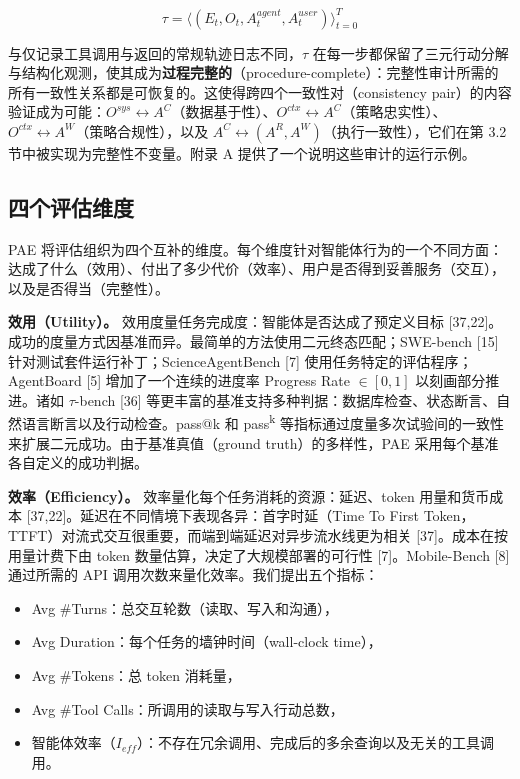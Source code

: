 \documentclass[11pt,UTF8,fontset=fandol]{ctexart}
\begin{document}
\begin{equation}
\tau = \langle (E_t, O_t, A_t^{agent}, A_t^{user}) \rangle_{t=0}^{T} \tag{2}
\end{equation}

与仅记录工具调用与返回的常规轨迹日志不同，$\tau$ 在每一步都保留了三元行动分解与结构化观测，使其成为\textbf{过程完整的}（procedure-complete）：完整性审计所需的所有一致性关系都是可恢复的。这使得跨四个一致性对（consistency pair）的内容验证成为可能：$O^{sys} \leftrightarrow A^C$（数据基于性）、$O^{ctx} \leftrightarrow A^C$（策略忠实性）、$O^{ctx} \leftrightarrow A^W$（策略合规性），以及 $A^C \leftrightarrow (A^R, A^W)$（执行一致性），它们在第 3.2 节中被实现为完整性不变量。附录 A 提供了一个说明这些审计的运行示例。

\subsection{四个评估维度}

PAE 将评估组织为四个互补的维度。每个维度针对智能体行为的一个不同方面：达成了什么（效用）、付出了多少代价（效率）、用户是否得到妥善服务（交互），以及是否得当（完整性）。

\textbf{效用（Utility）。} 效用度量任务完成度：智能体是否达成了预定义目标 [37,22]。成功的度量方式因基准而异。最简单的方法使用二元终态匹配；SWE-bench [15] 针对测试套件运行补丁；ScienceAgentBench [7] 使用任务特定的评估程序；AgentBoard [5] 增加了一个连续的进度率 Progress Rate $\in [0, 1]$ 以刻画部分推进。诸如 $\tau$-bench [36] 等更丰富的基准支持多种判据：数据库检查、状态断言、自然语言断言以及行动检查。pass@k 和 pass\textsuperscript{k} 等指标通过度量多次试验间的一致性来扩展二元成功。由于基准真值（ground truth）的多样性，PAE 采用每个基准各自定义的成功判据。

\textbf{效率（Efficiency）。} 效率量化每个任务消耗的资源：延迟、token 用量和货币成本 [37,22]。延迟在不同情境下表现各异：首字时延（Time To First Token，TTFT）对流式交互很重要，而端到端延迟对异步流水线更为相关 [37]。成本在按用量计费下由 token 数量估算，决定了大规模部署的可行性 [7]。Mobile-Bench [8] 通过所需的 API 调用次数来量化效率。我们提出五个指标：

\begin{itemize}[leftmargin=2em]
\item Avg \#Turns：总交互轮数（读取、写入和沟通），
\item Avg Duration：每个任务的墙钟时间（wall-clock time），
\item Avg \#Tokens：总 token 消耗量，
\item Avg \#Tool Calls：所调用的读取与写入行动总数，
\item 智能体效率（$I_{eff}$）：不存在冗余调用、完成后的多余查询以及无关的工具调用。
\end{itemize}
\end{document}
